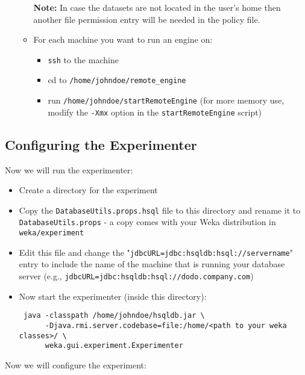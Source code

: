 \documentclass[a4paper]{article}
\begin{document}
\begin{itemize}
\begin{itemize}
            \textbf{Note:} In case the datasets are not located in the user's home then another file permission entry will be needed in the policy file.
         \item For each machine you want to run an engine on:
         	\begin{itemize}
         		\item \texttt{ssh} to the machine
               \item cd to \texttt{/home/johndoe/remote\_engine}
               \item run \texttt{/home/johndoe/startRemoteEngine} (for more memory use, modify the \texttt{-Xmx} option in the \texttt{startRemoteEngine} script) 
            \end{itemize}
      \end{itemize}
\end{itemize}


\subsection{Configuring the Experimenter}

Now we will run the experimenter:

\begin{itemize}
   \item Create a directory for the experiment
   \item Copy the \texttt{DatabaseUtils.props.hsql} file to this directory and rename it to \texttt{DatabaseUtils.props} - a copy comes with your Weka distribution in \texttt{weka/experiment}
   \item Edit this file and change the "\texttt{jdbcURL=jdbc:hsqldb:hsql://servername}" entry to include the name of the machine that is running your database server (e.g., \texttt{jdbcURL=jdbc:hsqldb:hsql://dodo.company.com})
   \item Now start the experimenter (inside this directory): 
		\begin{verbatim}
 java -classpath /home/johndoe/hsqldb.jar \
      -Djava.rmi.server.codebase=file:/home/<path to your weka classes>/ \
      weka.gui.experiment.Experimenter
		\end{verbatim}
\end{itemize}

Now we will configure the experiment:
\end{document}
